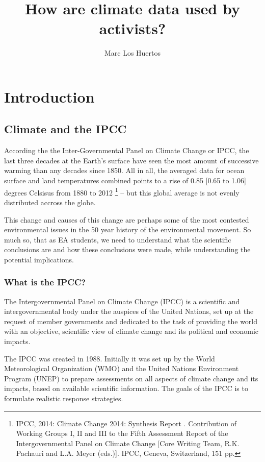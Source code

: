 \documentclass{article}\usepackage[]{graphicx}\usepackage[]{color}
\title{How are climate data used by activists?}
\author{Marc Los Huertos}
\begin{document}
\maketitle
\tableofcontents

\newpage
\section{Introduction}

\subsection{Climate and the IPCC}

According the the Inter-Governmental Panel on Climate Change or IPCC, the last three decades at the Earth's surface have seen the most amount of successive warming than any decades since 1850. All in all, the averaged data for ocean surface and land temperatures combined points to a rise of 0.85 [0.65 to 1.06] degrees Celsisus  from 1880 to 2012 \footnote{IPCC,  2014: Climate  Change  2014:  Synthesis  Report
. Contribution  of  Working  Groups  I,  II  and  III  to  the  Fifth  Assessment  Report  of  the Intergovernmental Panel on Climate Change [Core Writing Team, R.K. Pachauri and L.A. Meyer (eds.)]. IPCC, Geneva, Switzerland, 151 pp.} -- but this global average is not evenly distributed accross the globe. 

This change and causes of this change are perhaps some of the most contested environmental issues in the 50 year history of the environmental movement. So much so, that as EA students, we need to understand what the scientific conclusions are and how these conclusions were made, while understanding the potential implications.

\subsubsection{What is the IPCC?}

The Intergovernmental Panel on Climate Change (IPCC) is a scientific and intergovernmental body under the auspices of the United Nations, set up at the request of member governments and dedicated to the task of providing the world with an objective, scientific view of climate change and its political and economic impacts.

The IPCC was created in 1988. Initially it was set up by the World Meteorological Organization (WMO) and the United Nations Environment Program (UNEP) to prepare assessments on all aspects of climate change and its impacts, based on available scientific information. The goals of the IPCC is to formulate realistic response strategies. 
\end{document}
